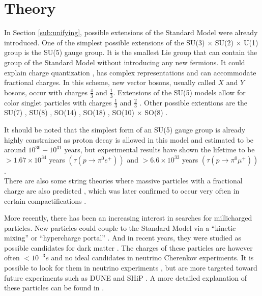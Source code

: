 \section{Theory}
In Section \ref{sub:unifying}, possible extensions of the Standard Model were already introduced. One of the simplest possible extensions of the SU(3) $\times$ SU(2) $\times$ U(1) group is the SU(5) gauge group. It is the smallest Lie group that can contain the group of the Standard Model without introducing any new fermions. It could explain charge quantization \cite{He:1989eq}, has complex representations and can accommodate fractional charges. In this scheme, new vector bosons, usually called $X$ and $Y$ bosons, occur with charges $\frac{4}{3}$ and $\frac{1}{3}$. Extensions of the SU(5) models allow for color singlet particles with charges $\frac{1}{3}$ and $\frac{2}{3}$ \cite{Barr:1982vj}. Other possible extentions are the SU(7) \cite{Frampton:1982gc}, SU(8) \cite{Yu:1984pb}, SO(14) \cite{Yamamoto:1982sk}, SO(18) \cite{Dong:1983nh}, SO(10) $\times$ SO(8) \cite{Jiang:1985jy}. 

It should be noted that the simplest form of an SU(5) gauge group is already highly constrained as proton decay is allowed in this model and estimated to be around $10^{30}-10^{31}$ years, but experimental results have shown the lifetime to be $>1.67 \times 10^{34}$ years $\left(\tau\left(p \rightarrow \pi^0 e^+\right)\right)$ \cite{Bajc:2016qcc} and $>6.6 \times 10^{33}$ years $\left(\tau\left(p \rightarrow \pi^0 \mu^+\right)\right)$ \cite{Nishino:2009aa}.\\
\newline
There are also some string theories where massive particles with a fractional charge are also predicted \cite{Wen:1985qj,Antoniadis:1992eb}, which was later confirmed to occur very often in certain compactifications \cite{Athanasiu:1988uj}.

More recently, there has been an increasing interest in searches for millicharged particles. New particles could couple to the Standard Model via a ``kinetic mixing'' or ``hypercharge portal'' \cite{Holdom:1985ag,Izaguirre:2015eya}. And in recent years, they were studied as possible candidates for dark matter \cite{Brahm:1989jh,Boehm:2003hm,Pospelov:2007mp,Bjorken:2009mm}. The charges of these particles are however often $<10^{-3}e$ and no ideal candidates in neutrino Cherenkov experiments. It is possible to look for them in neutrino experiments \cite{Magill:2018tbb}, but are more targeted toward future experiments such as DUNE \cite{Acciarri:2015uup} and SHiP \cite{Anelli:2015pba}. A more detailed explanation of these particles can be found in \cite{Battaglieri:2017aum}.

